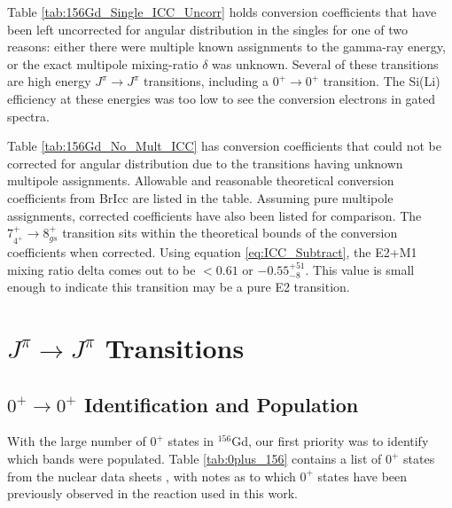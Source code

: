 \afterpage{\clearpage}

Table \ref{tab:156Gd_Single_ICC_Uncorr} holds conversion coefficients that have been left uncorrected for angular distribution in the singles for one of two reasons: either there were multiple known assignments to the gamma-ray energy, or the exact multipole mixing-ratio $\delta$ was unknown. Several of these transitions are high energy $J^\pi\rightarrow J^\pi$ transitions, including a $0^+\rightarrow0^+$ transition. The Si(Li) efficiency at these energies was too low to see the conversion electrons in gated spectra.

\afterpage{\clearpage}

Table \ref{tab:156Gd_No_Mult_ICC} has conversion coefficients that could not be corrected for angular distribution due to the transitions having unknown multipole assignments. Allowable and reasonable theoretical conversion coefficients from BrIcc\citep{kibedi08:_BRICC} are listed in the table. Assuming pure multipole assignments, corrected coefficients have also been listed for comparison. The $7^+_{4^+}\rightarrow 8^+_{gs}$ transition sits within the theoretical bounds of the conversion coefficients when corrected. Using equation \ref{eq:ICC_Subtract}, the E2+M1 mixing ratio delta comes out to be $<0.61$ or $-0.55^{+51}_{-8}$. This value is small enough to indicate this transition may be a pure E2 transition. 

\afterpage{\clearpage}

\section{$J^{\pi}\rightarrow J^{\pi}$ Transitions}

\subsection{$0^{+}\rightarrow 0^{+}$ Identification and Population}

With the large number of $0^+$ states in $^{156}$Gd, our first priority was to identify which bands were populated. Table \ref{tab:0plus_156} contains a list of $0^+$ states from the nuclear data sheets \citep{reich12:_nds_156}, with notes as to which $0^+$ states have been previously observed in the reaction used in this work.



